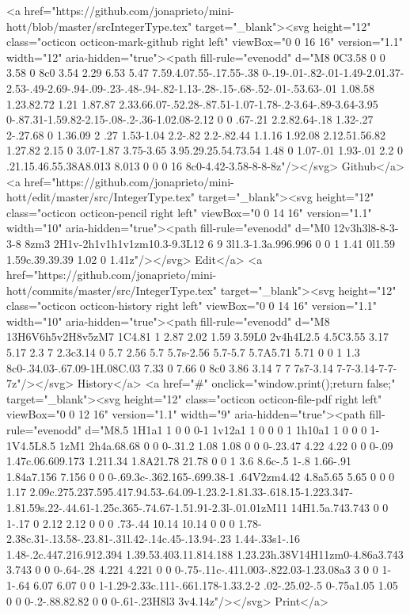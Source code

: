       <a href="https://github.com/jonaprieto/mini-hott/blob/master/srcIntegerType.tex" target="_blank"><svg height="12" class="octicon octicon-mark-github right left" viewBox="0 0 16 16" version="1.1" width="12" aria-hidden="true"><path fill-rule="evenodd" d="M8 0C3.58 0 0 3.58 0 8c0 3.54 2.29 6.53 5.47 7.59.4.07.55-.17.55-.38 0-.19-.01-.82-.01-1.49-2.01.37-2.53-.49-2.69-.94-.09-.23-.48-.94-.82-1.13-.28-.15-.68-.52-.01-.53.63-.01 1.08.58 1.23.82.72 1.21 1.87.87 2.33.66.07-.52.28-.87.51-1.07-1.78-.2-3.64-.89-3.64-3.95 0-.87.31-1.59.82-2.15-.08-.2-.36-1.02.08-2.12 0 0 .67-.21 2.2.82.64-.18 1.32-.27 2-.27.68 0 1.36.09 2 .27 1.53-1.04 2.2-.82 2.2-.82.44 1.1.16 1.92.08 2.12.51.56.82 1.27.82 2.15 0 3.07-1.87 3.75-3.65 3.95.29.25.54.73.54 1.48 0 1.07-.01 1.93-.01 2.2 0 .21.15.46.55.38A8.013 8.013 0 0 0 16 8c0-4.42-3.58-8-8-8z"/></svg> Github</a>
      <a href="https://github.com/jonaprieto/mini-hott/edit/master/src/IntegerType.tex" target="_blank"><svg height="12" class="octicon octicon-pencil right left" viewBox="0 0 14 16" version="1.1" width="10" aria-hidden="true"><path fill-rule="evenodd" d="M0 12v3h3l8-8-3-3-8 8zm3 2H1v-2h1v1h1v1zm10.3-9.3L12 6 9 3l1.3-1.3a.996.996 0 0 1 1.41 0l1.59 1.59c.39.39.39 1.02 0 1.41z"/></svg> Edit</a>
      <a href="https://github.com/jonaprieto/mini-hott/commits/master/src/IntegerType.tex" target="_blank"><svg height="12" class="octicon octicon-history right left" viewBox="0 0 14 16" version="1.1" width="10" aria-hidden="true"><path fill-rule="evenodd" d="M8 13H6V6h5v2H8v5zM7 1C4.81 1 2.87 2.02 1.59 3.59L0 2v4h4L2.5 4.5C3.55 3.17 5.17 2.3 7 2.3c3.14 0 5.7 2.56 5.7 5.7s-2.56 5.7-5.7 5.7A5.71 5.71 0 0 1 1.3 8c0-.34.03-.67.09-1H.08C.03 7.33 0 7.66 0 8c0 3.86 3.14 7 7 7s7-3.14 7-7-3.14-7-7-7z"/></svg> History</a>
      <a  href="#" onclick="window.print();return false;" target="_blank"><svg height="12" class="octicon octicon-file-pdf right left" viewBox="0 0 12 16" version="1.1" width="9" aria-hidden="true"><path fill-rule="evenodd" d="M8.5 1H1a1 1 0 0 0-1 1v12a1 1 0 0 0 1 1h10a1 1 0 0 0 1-1V4.5L8.5 1zM1 2h4a.68.68 0 0 0-.31.2 1.08 1.08 0 0 0-.23.47 4.22 4.22 0 0 0-.09 1.47c.06.609.173 1.211.34 1.8A21.78 21.78 0 0 1 3.6 8.6c-.5 1-.8 1.66-.91 1.84a7.156 7.156 0 0 0-.69.3c-.362.165-.699.38-1 .64V2zm4.42 4.8a5.65 5.65 0 0 0 1.17 2.09c.275.237.595.417.94.53-.64.09-1.23.2-1.81.33-.618.15-1.223.347-1.81.59s.22-.44.61-1.25c.365-.74.67-1.51.91-2.3l-.01.01zM11 14H1.5a.743.743 0 0 1-.17 0 2.12 2.12 0 0 0 .73-.44 10.14 10.14 0 0 0 1.78-2.38c.31-.13.58-.23.81-.31l.42-.14c.45-.13.94-.23 1.44-.33s1-.16 1.48-.2c.447.216.912.394 1.39.53.403.11.814.188 1.23.23h.38V14H11zm0-4.86a3.743 3.743 0 0 0-.64-.28 4.221 4.221 0 0 0-.75-.11c-.411.003-.822.03-1.23.08a3 3 0 0 1-1-.64 6.07 6.07 0 0 1-1.29-2.33c.111-.661.178-1.33.2-2 .02-.25.02-.5 0-.75a1.05 1.05 0 0 0-.2-.88.82.82 0 0 0-.61-.23H8l3 3v4.14z"/></svg> Print</a>
